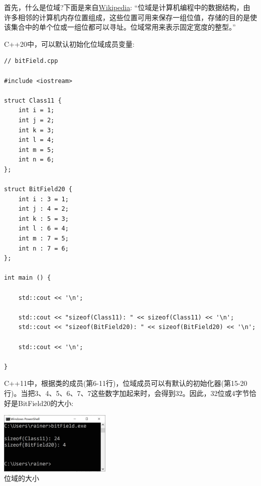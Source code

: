 首先，什么是位域?下面是来自\href{https://en.wikipedia.org/wiki/Bit_field}{Wikipedia}: “位域是计算机编程中的数据结构，由许多相邻的计算机内存位置组成，这些位置可用来保存一组位值，存储的目的是使该集合中的单个位或一组位都可以寻址。位域常用来表示固定宽度的整型。”

C++20中，可以默认初始化位域成员变量:

\begin{lstlisting}[style=styleCXX]
// bitField.cpp

#include <iostream>

struct Class11 {
	int i = 1;
	int j = 2;
	int k = 3;
	int l = 4;
	int m = 5;
	int n = 6;
};

struct BitField20 {
	int i : 3 = 1;
	int j : 4 = 2;
	int k : 5 = 3;
	int l : 6 = 4;
	int m : 7 = 5;
	int n : 7 = 6;
};

int main () {
	
	std::cout << '\n';
	
	std::cout << "sizeof(Class11): " << sizeof(Class11) << '\n';
	std::cout << "sizeof(BitField20): " << sizeof(BitField20) << '\n';
	
	std::cout << '\n';

}
\end{lstlisting}

C++11中，根据类的成员(第6-11行)，位域成员可以有默认的初始化器(第15-20行)。当把3、4、5、6、7、7这些数字加起来时，会得到32。因此，32位或4字节恰好是BitField20的大小:

\begin{center}
\includegraphics[width=0.4\textwidth]{content/3/chapter4/images/49.png}\\
位域的大小
\end{center}

